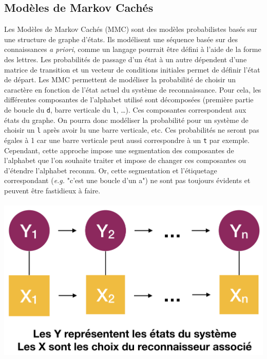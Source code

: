 \subsection{Modèles de Markov Cachés}

Les Modèles de Markov Cachés (MMC) sont des modèles probabilistes basés sur une structure de
graphe d'états. Ils modélisent une séquence basée sur des connaissances \textit{a priori},
comme un langage pourrait être défini à l'aide de la forme des lettres. Les probabilités de passage
d'un état à un autre dépendent d'une matrice de transition et un vecteur de conditions initiales
permet de définir l'état de départ. Les MMC permettent de modéliser la probabilité de choisir un caractère
en fonction de l'état actuel du système de reconnaissance. Pour cela, les différentes composantes
de l'alphabet utilisé sont décomposées (première partie de boucle du \texttt{d}, barre verticale du \texttt{l}, \ldots).
Ces composantes correspondent aux états du graphe. On pourra donc modéliser la
probabilité pour un système de choisir un \texttt{l} après avoir lu une barre verticale, etc.
Ces probabilités ne seront pas égales à 1 car une barre verticale peut aussi correspondre à un
\texttt{t} par exemple. Cependant, cette approche impose une segmentation des composantes
de l'alphabet que l'on souhaite traiter et impose de changer ces composantes ou d'étendre
l'alphabet reconnu. Or, cette segmentation et l'étiquetage correspondant (\textit{e.g.} "c'est une boucle d'un a")
ne sont pas toujours évidents et peuvent être fastidieux à faire.

\newpage

\paragraph{}
\begin{mdframed}[frametitle={Schéma de transition et d'observation d'un MMC}, innerbottommargin=10]
\begin{center}
\includegraphics[width=0.6\linewidth]{mmc.png}
\end{center}
\end{mdframed}

